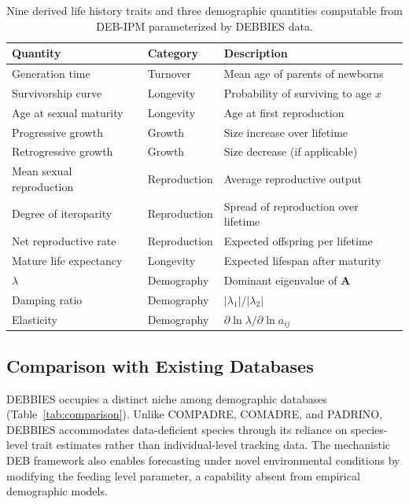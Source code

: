 \documentclass[11pt]{article}
\begin{document}
\begin{table}[H]
\centering
\caption{Nine derived life history traits and three demographic quantities computable from DEB-IPM parameterized by DEBBIES data.}
\label{tab:derived}
\begin{tabular}{lll}
\toprule
\textbf{Quantity} & \textbf{Category} & \textbf{Description} \\
\midrule
Generation time & Turnover & Mean age of parents of newborns \\
Survivorship curve & Longevity & Probability of surviving to age $x$ \\
Age at sexual maturity & Longevity & Age at first reproduction \\
Progressive growth & Growth & Size increase over lifetime \\
Retrogressive growth & Growth & Size decrease (if applicable) \\
Mean sexual reproduction & Reproduction & Average reproductive output \\
Degree of iteroparity & Reproduction & Spread of reproduction over lifetime \\
Net reproductive rate & Reproduction & Expected offspring per lifetime \\
Mature life expectancy & Longevity & Expected lifespan after maturity \\
\midrule
$\lambda$ & Demography & Dominant eigenvalue of $\mathbf{A}$ \\
Damping ratio & Demography & $|\lambda_1| / |\lambda_2|$ \\
Elasticity & Demography & $\partial \ln \lambda / \partial \ln a_{ij}$ \\
\bottomrule
\end{tabular}
\end{table}

\subsection{Comparison with Existing Databases}

DEBBIES occupies a distinct niche among demographic databases (Table~\ref{tab:comparison}). Unlike COMPADRE, COMADRE, and PADRINO, DEBBIES accommodates data-deficient species through its reliance on species-level trait estimates rather than individual-level tracking data. The mechanistic DEB framework also enables forecasting under novel environmental conditions by modifying the feeding level parameter, a capability absent from empirical demographic models.
\end{document}
